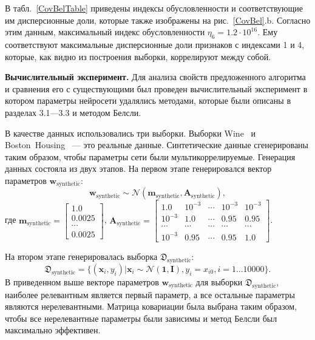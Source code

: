 В табл.~\ref{CovBelTable} приведены индексы обусловленности и соответствующие им дисперсионные доли, которые также изображены на рис.~\ref{CovBel}.b. Согласно этим данным, максимальный индекс обусловленности $\eta_6 = 1.2\cdot 10^{16}$. Ему соответствуют максимальные дисперсионные доли признаков с индексами 1 и 4, которые, как видно из построения выборки, коррелируют между собой.


\textbf{Вычислительный эксперимент. }
Для анализа свойств предложенного алгоритма и сравнения его с существующими был проведен вычислительный эксперимент в котором параметры нейросети удалялись методами,  которые были описаны в разделах 3.1---3.3 и методом Белсли.

В качестве данных использовались три выборки. Выборки Wine~\cite{Wine} и Boston~Housing~\cite{Boston}  --- это реальные данные. Синтетические данные сгенерированы таким образом, чтобы параметры сети были мультикоррелируемые. Генерация данных состояла из двух этапов. 
На первом этапе генерировался вектор параметров $\mathbf{w}_{\text{synthetic}}$:
$$\mathbf{w}_{\text{synthetic}}  \sim \mathcal{N}(\textbf{m}_{\text{synthetic}}, \textbf{A}_{\text{synthetic}}),$$ 
где 
$\textbf{m}_{\text{synthetic}} = \begin{bmatrix}
1.0\\
0.0025\\
\cdots\\
0.0025
\end{bmatrix}$,
$\textbf{A}_{\text{synthetic}} = \begin{bmatrix}
1.0& 10^{-3}& \cdots& 10^{-3}& 10^{-3}\\
10^{-3}& 1.0& \cdots& 0.95& 0.95\\
\cdots&\cdots&\cdots&\cdots&\cdots\\
10^{-3}& 0.95& \cdots& 0.95& 1.0
\end{bmatrix}$.

На втором этапе генерировалась выборка $\mathfrak{D}_{\text{synthetic}}$:
$$\mathfrak{D}_{\text{synthetic}} = \{(\textbf{x}_i,y_i)| \textbf{x}_i \sim  \mathcal{N}(\textbf{1}, \textbf{I}), y_i = x_{i0}, i = 1 \dots 10000\}.$$
В приведенном выше векторе параметров $\mathbf{w}_{\text{synthetic}}$ для выборки $\mathfrak{D}_{\text{synthetic}}$, наиболее релевантным является первый параметр, а все остальные параметры являются нерелевантными. Матрица ковариации была выбрана таким образом, чтобы все нерелевантные параметры были зависимы и метод Белсли был максимально эффективен.



